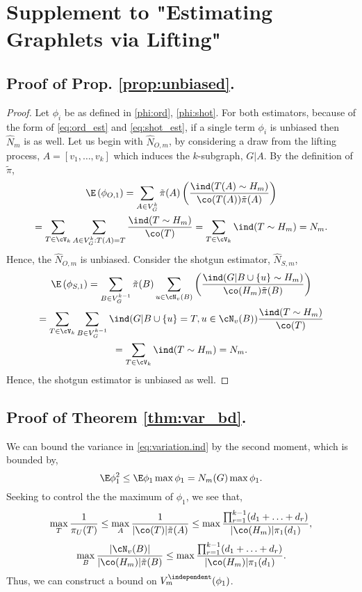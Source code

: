 \section{Supplement to "Estimating Graphlets via Lifting"}

\subsection{Proof of Prop. \ref{prop:unbiased}.}
    \begin{proof}
    Let $\phi_i$ be as defined in \eqref{phi:ord}, \eqref{phi:shot}.
    For both estimators, because of the form of \eqref{eq:ord_est} and \eqref{eq:shot_est}, if a single term $\phi_i$ is unbiased then $\hat N_m$ is as well.
    Let us begin with $\hat N_{O,m}$, by considering a draw from the lifting process, $A = [v_1,\ldots,v_k]$ which induces the $k$-subgraph, $G|A$.
    By the definition of $\tilde \pi$,
	\begin{multline*}
	    \E \left( \phi_{O,1} \right) = \sum_{A \in V_G^k} \tilde \pi(A) \left( \frac{\ind(T(A) \sim H_m)}{\co(T(A)) \tilde \pi(A)} \right) \\
	    = \sum_{T \in \cV_k} \sum_{A \in V_G^k : T(A) = T} \frac{\ind(T \sim H_m)}{\co(T)} = \sum_{T \in \cV_k} \ind(T \sim H_m) = N_m.  
	\end{multline*}
	Hence, the $\hat N_{O,m}$ is unbiased.
	Consider the shotgun estimator, $\hat N_{S,m}$,
	\begin{multline*}
	    \E \left( \phi_{S,1} \right) = \sum_{B \in V_G^{k-1}} \tilde \pi(B) \sum_{u \in \cN_v(B)} \left( \frac{\ind(G|B \cup \{u\} \sim H_m)}{\co(H_m) \tilde \pi(B)} \right) \\
	    = \sum_{T \in \cV_k} \sum_{B \in V_G^{k-1}} \ind(G|B \cup \{u\} = T, u \in \cN_v(B)) \frac{\ind(T \sim H_m)}{\co(T)} \\
	    = \sum_{T \in \cV_k} \ind(T \sim H_m) = N_m.  
	\end{multline*}
    Hence, the shotgun estimator is unbiased as well.
	\end{proof}


\subsection{Proof of Theorem \ref{thm:var_bd}.}
We can bound the variance in \eqref{eq:variation.ind} by the second moment, which is bounded by,
\begin{equation*}
    \E \phi_1^2 \leq \E \phi_1\max{\phi_1} = N_m(G)\max{\phi_1}.
\end{equation*}
Seeking to control the the maximum of $\phi_1$, we see that,
\begin{equation*}
    \max_T \frac{1}{\pi_U(T)} \le \max_A \frac{1}{|\co(T)| \tilde \pi(A)} \le 
    \max\frac{\prod_{r=1}^{k-1} (d_1+\ldots+d_r)}{|\co(H_m)|\pi_1(d_1)},
\end{equation*}
\begin{equation*}
    \max_B \frac{|\cN_v(B)|}{|\co(H_m)|\tilde\pi(B)} \le 
    \max\frac{\prod_{r=1}^{k-1} (d_1+\ldots+d_r)}{|\co(H_m)|\pi_1(d_1)}.
\end{equation*}
Thus, we can construct a bound on $V_m^{\independent}(\phi_1)$.

